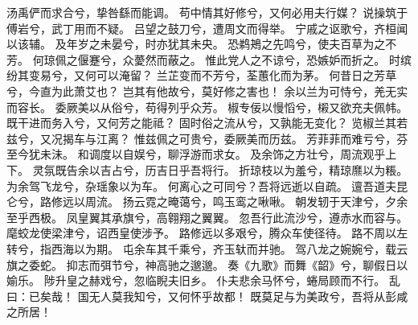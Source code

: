 汤禹俨而求合兮，挚咎繇而能调。
苟中情其好修兮，又何必用夫行媒？
说操筑于傅岩兮，武丁用而不疑。
吕望之鼓刀兮，遭周文而得举。
宁戚之讴歌兮，齐桓闻以该辅。
及年岁之未晏兮，时亦犹其未央。
恐鹈鴂之先鸣兮，使夫百草为之不芳。
何琼佩之偃蹇兮，众薆然而蔽之。
惟此党人之不谅兮，恐嫉妒而折之。
时缤纷其变易兮，又何可以淹留？
兰芷变而不芳兮，荃蕙化而为茅。
何昔日之芳草兮，今直为此萧艾也？
岂其有他故兮，莫好修之害也！
余以兰为可恃兮，羌无实而容长。
委厥美以从俗兮，苟得列乎众芳。
椒专佞以慢慆兮，樧又欲充夫佩帏。
既干进而务入兮，又何芳之能祗？
固时俗之流从兮，又孰能无变化？
览椒兰其若兹兮，又况揭车与江离？
惟兹佩之可贵兮，委厥美而历兹。
芳菲菲而难亏兮，芬至今犹未沬。
和调度以自娱兮，聊浮游而求女。
及余饰之方壮兮，周流观乎上下。
灵氛既告余以吉占兮，历吉日乎吾将行。
折琼枝以为羞兮，精琼爢以为粻。
为余驾飞龙兮，杂瑶象以为车。
何离心之可同兮？吾将远逝以自疏。
邅吾道夫昆仑兮，路修远以周流。
扬云霓之晻蔼兮，鸣玉鸾之啾啾。
朝发轫于天津兮，夕余至乎西极。
凤皇翼其承旗兮，高翱翔之翼翼。
忽吾行此流沙兮，遵赤水而容与。
麾蛟龙使梁津兮，诏西皇使涉予。
路修远以多艰兮，腾众车使径待。
路不周以左转兮，指西海以为期。
屯余车其千乘兮，齐玉轪而并驰。
驾八龙之婉婉兮，载云旗之委蛇。
抑志而弭节兮，神高驰之邈邈。
奏《九歌》而舞《韶》兮，聊假日以媮乐。
陟升皇之赫戏兮，忽临睨夫旧乡。
仆夫悲余马怀兮，蜷局顾而不行。
乱曰：已矣哉！
国无人莫我知兮，又何怀乎故都！
既莫足与为美政兮，吾将从彭咸之所居！